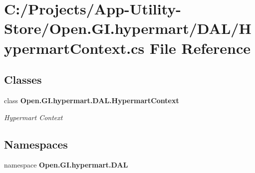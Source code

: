 \section{C\+:/\+Projects/\+App-\/\+Utility-\/\+Store/\+Open.G\+I.\+hypermart/\+D\+A\+L/\+Hypermart\+Context.cs File Reference}
\label{_hypermart_context_8cs}
\subsection*{Classes}
\begin{DoxyCompactItemize}
\item 
class \textbf{ Open.\+G\+I.\+hypermart.\+D\+A\+L.\+Hypermart\+Context}
\begin{DoxyCompactList}\small\item\em Hypermart Context \end{DoxyCompactList}\end{DoxyCompactItemize}
\subsection*{Namespaces}
\begin{DoxyCompactItemize}
\item 
namespace \textbf{ Open.\+G\+I.\+hypermart.\+D\+AL}
\end{DoxyCompactItemize}
